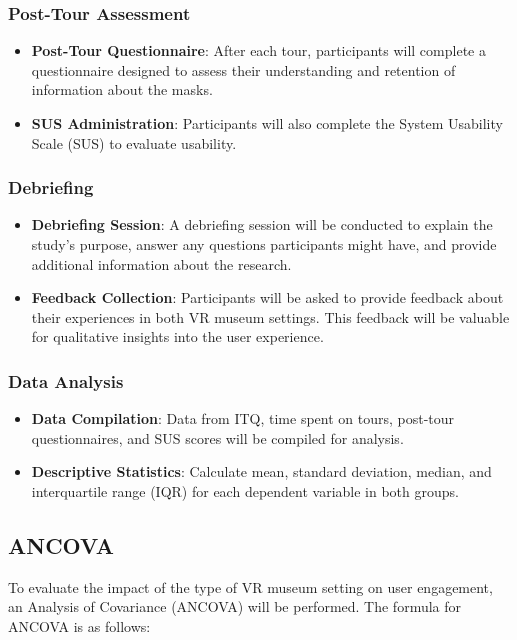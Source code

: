 \documentclass[conference]{IEEEtran}
\begin{document}
\subsubsection{Post-Tour Assessment}
\begin{itemize}
    \item \textbf{Post-Tour Questionnaire}: After each tour, participants will complete a questionnaire designed to assess their understanding and retention of information about the masks.
    \item \textbf{SUS Administration}: Participants will also complete the System Usability Scale (SUS) to evaluate usability.
\end{itemize}
\subsubsection{Debriefing}
\begin{itemize}
    \item \textbf{Debriefing Session}: A debriefing session will be conducted to explain the study's purpose, answer any questions participants might have, and provide additional information about the research.
    \item \textbf{Feedback Collection}: Participants will be asked to provide feedback about their experiences in both VR museum settings. This feedback will be valuable for qualitative insights into the user experience.
\end{itemize}
\subsubsection{Data Analysis}
\begin{itemize}
    \item \textbf{Data Compilation}: Data from ITQ, time spent on tours, post-tour questionnaires, and SUS scores will be compiled for analysis.
    \item \textbf{Descriptive Statistics}: Calculate mean, standard deviation, median, and interquartile range (IQR) for each dependent variable in both groups.
\end{itemize}
\subsection{ANCOVA}

To evaluate the impact of the type of VR museum setting on user engagement, an Analysis of Covariance (ANCOVA) will be performed. The formula for ANCOVA is as follows:
\end{document}
